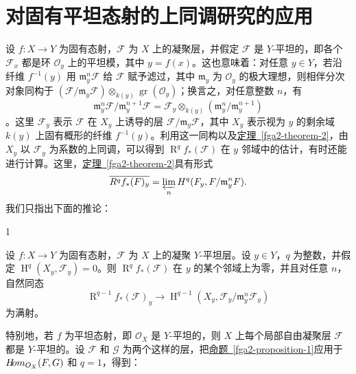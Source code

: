 \chapter{对固有平坦态射的上同调研究的应用}\thispagestyle{fancy}\label{fga2-5}
\par{}设 \(f\colon  X\to  Y\) 为固有态射，\(\mathscr {F}\) 为 \(X\) 上的凝聚层，并假定 \(\mathscr {F}\) 是 \(Y\)-平坦的，即各个 \(\mathscr {F}_x\) 都是环 \(\mathcal {O}_y\) 上的平坦模，其中 \(y=f(x)\)。这也意味着：对任意 \(y\in  Y\)，若沿纤维 \(f^{-1}(y)\) 用 \(\mathfrak {m}_y^n\mathscr {F}\) 给 \(\mathscr {F}\) 赋予滤过，其中 \(\mathfrak {m}_y\) 为 \(\mathcal {O}_y\) 的极大理想，则相伴分次对象同构于 \((\mathscr {F}/\mathfrak {m}_y\mathscr {F})\otimes _{k(y)}\operatorname {gr}(\mathcal {O}_y)\)；换言之，对任意整数 \(n\)，有 \[     \mathfrak {m}_y^n\mathscr {F}/\mathfrak {m}_y^{n+1}\mathscr {F}     = \mathscr {F}_y\otimes _{k(y)}(\mathfrak {m}_y^n/\mathfrak {m}_y^{n+1})   \]。这里 \(\mathscr {F}_y\) 表示 \(\mathscr {F}\) 在 \(X_y\) 上诱导的层 \(\mathscr {F}/\mathfrak {m}_y\mathscr {F}\)，其中 \(X_y\) 表示视为 \(y\) 的剩余域 \(k(y)\) 上固有概形的纤维 \(f^{-1}(y)\)。利用这一同构以及\hyperref[fga2-theorem-2]{定理~\ref*{fga2-theorem-2}}，由 \(X_y\) 以 \(\mathscr {F}_y\) 为系数的上同调，可以得到 \(\operatorname {R}^q f_*(\mathscr {F})\) 在 \(y\) 邻域中的估计，有时还能进行计算。这里，\hyperref[fga2-theorem-2]{定理~\ref*{fga2-theorem-2}}具有形式 \[     \overline {\operatorname {R}^q f_*(\mathscr {F})_y}     = \varprojlim _n \operatorname {H}^q(\mathscr {F}_y,\mathscr {F}/\mathfrak {m}_y^n\mathscr {F}).   \] 我们只指出下面的推论：
\begin{proposition}{1}\label{fga2-proposition-1}\skipsinglepar
\par{}设 \(f\colon  X\to  Y\) 为固有态射，\(\mathscr {F}\) 为 \(X\) 上的凝聚 \(Y\)-平坦层。设 \(y\in  Y\)，\(q\) 为整数，并假定 \(\operatorname {H}^q(X_y,\mathscr {F}_y)=0\)。则 \(\operatorname {R}^q f_*(\mathscr {F})\) 在 \(y\) 的某个邻域上为零，并且对任意 \(n\)，自然同态 \[       \operatorname {R}^{q-1}f_*(\mathscr {F})_y       \to  \operatorname {H}^{q-1}(X_y,\mathscr {F}_y/\mathfrak {m}_y^n\mathscr {F}_y)     \] 为满射。\end{proposition}
\par{}特别地，若 \(f\) 为平坦态射，即 \(\mathcal {O}_X\) 是 \(Y\)-平坦的，则 \(X\) 上每个局部自由凝聚层 \(\mathscr {F}\) 都是 \(Y\)-平坦的。设 \(\mathscr {F}\) 和 \(\mathscr {G}\) 为两个这样的层，把\hyperref[fga2-proposition-1]{命题~\ref*{fga2-proposition-1}}应用于 \(\mathscr {H}\kern  -2.5pt\mathit {om}_{\mathcal {O}_X}(\mathscr {F},\mathscr {G})\) 和 \(q=1\)，得到：
